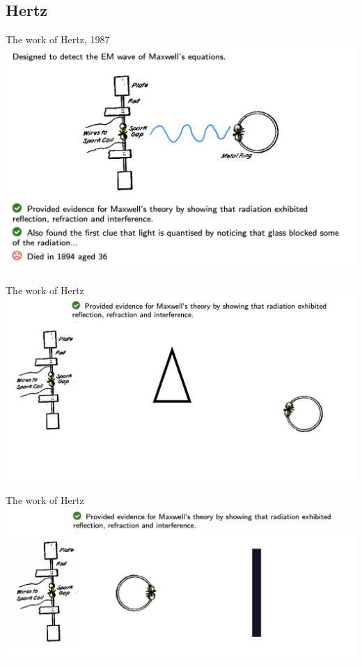 \subsection{Hertz}

\begin{frame}{The work of Hertz, 1987}
\small
\includegraphics[scale=0.4]{hertz1}
\end{frame}

\begin{frame}{The work of Hertz}
\small
\includegraphics[scale=0.4]{hertz2}
\end{frame}

\begin{frame}{The work of Hertz}
\small
\includegraphics[scale=0.4]{hertz3}
\end{frame}

